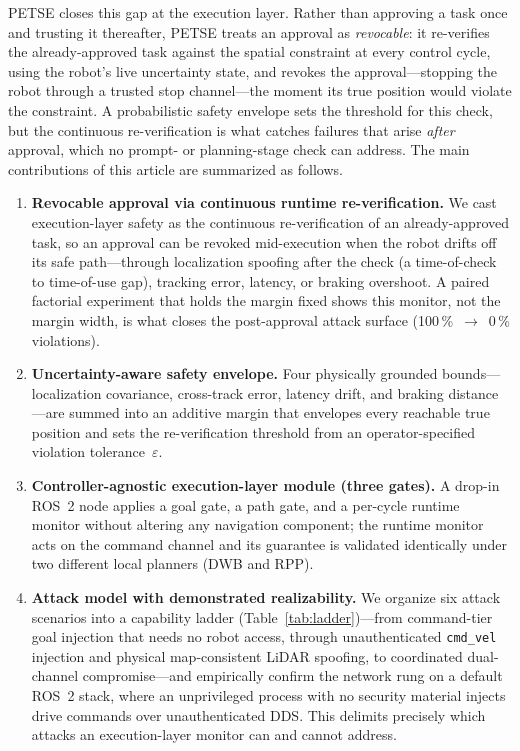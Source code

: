 \documentclass[journal,twoside,web]{ieeecolor}
\begin{document}
PETSE closes this gap at the execution layer. Rather than approving a task once and trusting it thereafter, PETSE treats an approval as \emph{revocable}: it re-verifies the already-approved task against the spatial constraint at every control cycle, using the robot's live uncertainty state, and revokes the approval---stopping the robot through a trusted stop channel---the moment its true position would violate the constraint. A probabilistic safety envelope sets the threshold for this check, but the continuous re-verification is what catches failures that arise \emph{after} approval, which no prompt- or planning-stage check can address. The main contributions of this article are summarized as follows.
\begin{enumerate}
\item \textbf{Revocable approval via continuous runtime re-verification.}
We cast execution-layer safety as the continuous re-verification of an already-approved task, so an approval can be revoked mid-execution when the robot drifts off its safe path---through localization spoofing after the check (a time-of-check to time-of-use gap), tracking error, latency, or braking overshoot. A paired factorial experiment that holds the margin fixed shows this monitor, not the margin width, is what closes the post-approval attack surface (100\,\%~$\rightarrow$~0\,\% violations).

\item \textbf{Uncertainty-aware safety envelope.}
Four physically grounded bounds---localization covariance, cross-track error, latency drift, and braking distance---are summed into an additive margin that envelopes every reachable true position and sets the re-verification threshold from an operator-specified violation tolerance~$\varepsilon$.

\item \textbf{Controller-agnostic execution-layer module (three gates).}
A drop-in ROS~2 node applies a goal gate, a path gate, and a per-cycle runtime monitor without altering any navigation component; the runtime monitor acts on the command channel and its guarantee is validated identically under two different local planners (DWB and RPP).

\item \textbf{Attack model with demonstrated realizability.}
We organize six attack scenarios into a capability ladder (Table~\ref{tab:ladder})---from command-tier goal injection that needs no robot access, through unauthenticated \texttt{cmd\_vel} injection and physical map-consistent LiDAR spoofing, to coordinated dual-channel compromise---and empirically confirm the network rung on a default ROS~2 stack, where an unprivileged process with no security material injects drive commands over unauthenticated DDS. This delimits precisely which attacks an execution-layer monitor can and cannot address.


\end{enumerate}
\end{document}
